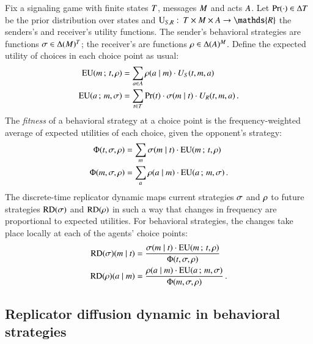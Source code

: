 Fix a signaling game with finite states $T$, messages $M$
and acts $A$. Let $\Pr(\cdot) \in \Delta{\ensuremath{T}}$ be the prior
distribution over states and $\Util_{\sen,\rec} \mycolon \States
\times \Messgs \times \Acts \rightarrow \mathds{R}$ the senders's and
receiver's utility functions. The sender's behavioral strategies are
functions $\sigma \in \Delta(M)^T$; the receiver's are
functions $\rho \in \Delta(A)^M$. Define the expected
utility of choices in each choice point as usual:
\begin{align*}
  \mathrm{EU}(m \thinspace ; \thinspace t, \rho) & = \sum_{a \in A}
  \rho(a \mid m) \cdot U_S(t, m, a) \\
  \mathrm{EU}(a \thinspace ; \thinspace m, \sigma) & = \sum_{t \in
    T} \Pr(t) \cdot \sigma(m \mid t) \cdot
  U_R(t, m, a) \,.
\end{align*}
The \emph{fitness} of a behavioral strategy at a choice point is the
frequency-weighted average of expected utilities of each choice, given
the opponent's strategy:
\begin{align*}
  \Phi(t,\sigma, \rho) & = \sum_{m} \sigma(m \mid t) \cdot
\mathrm{EU}(m \thinspace ; \thinspace t,\rho) \\
\Phi(m,\sigma, \rho) & = \sum_{a} \rho(a \mid m)
\cdot \mathrm{EU}(a \thinspace ; \thinspace m,\sigma)\,.
\end{align*}
The discrete-time replicator dynamic maps current strategies $\sigma$
and $\rho$ to future strategies $\mathrm{RD}(\sigma)$ and $\mathrm{RD}(\rho)$
in such a way that changes in frequency are proportional to expected
utilities. For behavioral strategies, the changes take place locally
at each of the agents' choice points:
\begin{align*}
  \mathrm{RD}(\sigma)(m \mid t) & = \frac{\sigma(m \mid t) \cdot
    \mathrm{EU}(m \thinspace ; \thinspace t,\rho)} {\Phi(t,\sigma, \rho)} \\
    \mathrm{RD}(\rho)(a \mid m) & = \frac{\rho(a \mid m) \cdot
    \mathrm{EU}(a \thinspace ; \thinspace m,\sigma)} {\Phi(m,\sigma, \rho)}  \,.
\end{align*}


\subsection{Replicator diffusion dynamic in behavioral strategies}
\label{sec:repl-diff-dynam-1}

